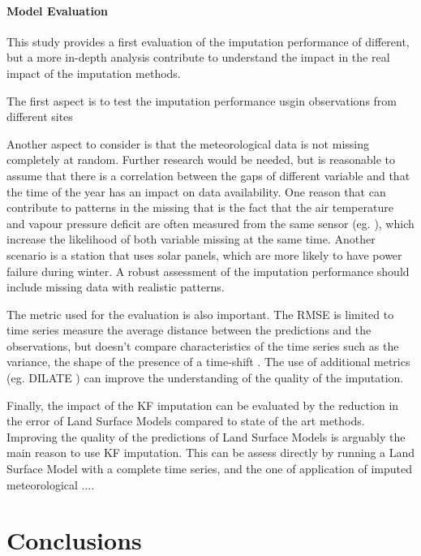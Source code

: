 \documentclass{article}
\let\Oldsection\section
\renewcommand{\section}{\FloatBarrier\Oldsection}
\begin{document}
\paragraph{Model Evaluation} This study provides a first evaluation of the imputation performance of different, but a more in-depth analysis contribute to understand the impact in the real impact of the imputation methods.

The first aspect is to test the imputation performance usgin observations from different sites

Another aspect to consider is that the meteorological data is not missing completely at random. Further research would be needed, but is reasonable to assume that there is a correlation between the gaps of different variable and that the time of the year has an impact on data availability. One reason that can contribute to patterns in the missing that is the fact that the air temperature and vapour pressure deficit are often measured from the same sensor (eg. \cite{noauthor_specification_nodate}), which increase the likelihood of both variable missing at the same time. Another scenario is a station that uses solar panels, which are more likely to have power failure during winter. A robust assessment of the imputation performance should include missing data with realistic patterns.

The metric used for the evaluation is also important. The RMSE is limited to time series measure the average distance between the predictions and the observations, but doesn't compare characteristics of the time series such as the variance, the shape of the presence of a time-shift \cite{guen_shape_nodate}. The use of additional metrics (eg. DILATE \cite{guen_shape_nodate}) can improve the understanding of the quality of the imputation.

Finally, the impact of the KF imputation can be evaluated by the reduction in the error of Land Surface Models compared to state of the art methods. Improving the quality of the predictions of Land Surface Models is arguably the main reason to use KF imputation. This can be assess directly by running a Land Surface Model with a complete time series, and the one of application of imputed meteorological ....


\section{Conclusions}
\end{document}

